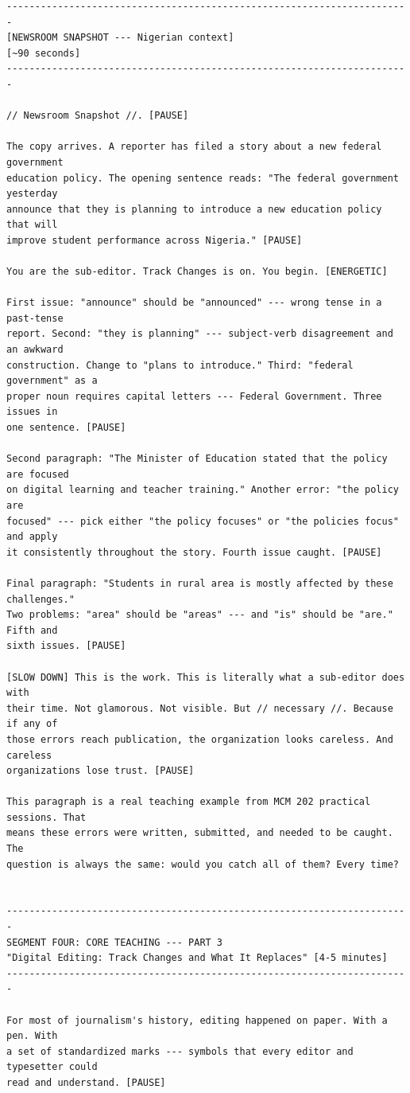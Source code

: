 {\begin{Verbatim}
-----------------------------------------------------------------------
[NEWSROOM SNAPSHOT --- Nigerian context]
[~90 seconds]
-----------------------------------------------------------------------

// Newsroom Snapshot //. [PAUSE]

The copy arrives. A reporter has filed a story about a new federal government
education policy. The opening sentence reads: "The federal government yesterday
announce that they is planning to introduce a new education policy that will
improve student performance across Nigeria." [PAUSE]

You are the sub-editor. Track Changes is on. You begin. [ENERGETIC]

First issue: "announce" should be "announced" --- wrong tense in a past-tense
report. Second: "they is planning" --- subject-verb disagreement and an awkward
construction. Change to "plans to introduce." Third: "federal government" as a
proper noun requires capital letters --- Federal Government. Three issues in
one sentence. [PAUSE]

Second paragraph: "The Minister of Education stated that the policy are focused
on digital learning and teacher training." Another error: "the policy are
focused" --- pick either "the policy focuses" or "the policies focus" and apply
it consistently throughout the story. Fourth issue caught. [PAUSE]

Final paragraph: "Students in rural area is mostly affected by these challenges."
Two problems: "area" should be "areas" --- and "is" should be "are." Fifth and
sixth issues. [PAUSE]

[SLOW DOWN] This is the work. This is literally what a sub-editor does with
their time. Not glamorous. Not visible. But // necessary //. Because if any of
those errors reach publication, the organization looks careless. And careless
organizations lose trust. [PAUSE]

This paragraph is a real teaching example from MCM 202 practical sessions. That
means these errors were written, submitted, and needed to be caught. The
question is always the same: would you catch all of them? Every time?


-----------------------------------------------------------------------
SEGMENT FOUR: CORE TEACHING --- PART 3
"Digital Editing: Track Changes and What It Replaces" [4-5 minutes]
-----------------------------------------------------------------------

For most of journalism's history, editing happened on paper. With a pen. With
a set of standardized marks --- symbols that every editor and typesetter could
read and understand. [PAUSE]


\end{Verbatim}}
